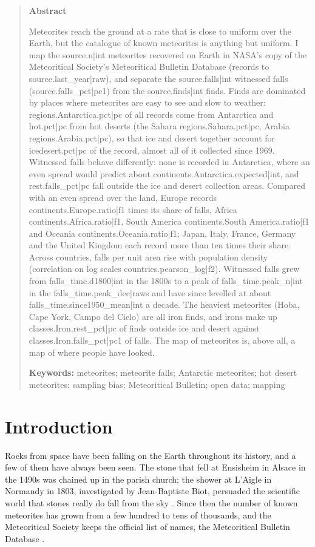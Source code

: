 \documentclass[11pt,a4paper]{article}
\begin{document}
\begin{quote}
\small
\begin{center}\textbf{Abstract}\end{center}
Meteorites reach the ground at a rate that is close to uniform over the Earth, but the catalogue of known meteorites is anything but uniform. I map the {{source.n|int}} meteorites recovered on Earth in NASA's copy of the Meteoritical Society's Meteoritical Bulletin Database (records to {{source.last_year|raw}}), and separate the {{source.falls|int}} witnessed falls ({{source.falls_pct|pc1}}) from the {{source.finds|int}} finds. Finds are dominated by places where meteorites are easy to see and slow to weather: {{regions.Antarctica.pct|pc}} of all records come from Antarctica and {{hot.pct|pc}} from hot deserts (the Sahara {{regions.Sahara.pct|pc}}, Arabia {{regions.Arabia.pct|pc}}), so that ice and desert together account for {{icedesert.pct|pc}} of the record, almost all of it collected since 1969. Witnessed falls behave differently: none is recorded in Antarctica, where an even spread would predict about {{continents.Antarctica.expected|int}}, and {{rest.falls_pct|pc}} fall outside the ice and desert collection areas. Compared with an even spread over the land, Europe records {{continents.Europe.ratio|f1}} times its share of falls, Africa {{continents.Africa.ratio|f1}}, South America {{continents.South America.ratio|f1}} and Oceania {{continents.Oceania.ratio|f1}}; Japan, Italy, France, Germany and the United Kingdom each record more than ten times their share. Across countries, falls per unit area rise with population density (correlation on log scales {{countries.pearson_log|f2}}). Witnessed falls grew from {{falls_time.d1800|int}} in the 1800s to a peak of {{falls_time.peak_n|int}} in the {{falls_time.peak_dec|raw}}s and have since levelled at about {{falls_time.since1950_mean|int}} a decade. The heaviest meteorites (Hoba, Cape York, Campo del Cielo) are all iron finds, and irons make up {{classes.Iron.rest_pct|pc}} of finds outside ice and desert against {{classes.Iron.falls_pct|pc1}} of falls. The map of meteorites is, above all, a map of where people have looked.

\textbf{Keywords:} meteorites; meteorite falls; Antarctic meteorites; hot desert meteorites; sampling bias; Meteoritical Bulletin; open data; mapping
\end{quote}

\section{Introduction}
Rocks from space have been falling on the Earth throughout its history, and a few of them have always been seen. The stone that fell at Ensisheim in Alsace in the 1490s was chained up in the parish church; the shower at L'Aigle in Normandy in 1803, investigated by Jean-Baptiste Biot, persuaded the scientific world that stones really do fall from the sky \citep{burke}. Since then the number of known meteorites has grown from a few hundred to tens of thousands, and the Meteoritical Society keeps the official list of names, the Meteoritical Bulletin Database \citep{metbull}.
\end{document}
